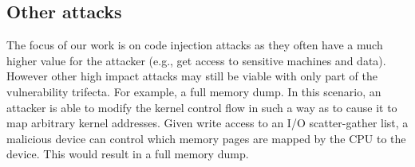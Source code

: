 \subsection{Other attacks}
The focus of our work is on code injection attacks as they often have a much higher value for the attacker (e.g., get access to sensitive machines and data). 
However other high impact attacks may still be viable with only part of the vulnerability trifecta. 
For example, a full memory dump.
In this scenario, an attacker is able to modify the kernel control flow in such a way as to cause it to map arbitrary kernel addresses. Given write access to an I/O scatter-gather list, a malicious device can control which memory pages are mapped by the CPU to the device. This would result in a full memory dump.

